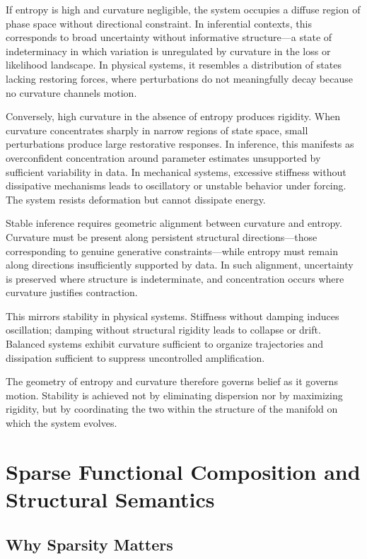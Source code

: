 \documentclass[12pt]{book}
\begin{document}
If entropy is high and curvature negligible, the system occupies a diffuse region of phase space without directional constraint. In inferential contexts, this corresponds to broad uncertainty without informative structure---a state of indeterminacy in which variation is unregulated by curvature in the loss or likelihood landscape. In physical systems, it resembles a distribution of states lacking restoring forces, where perturbations do not meaningfully decay because no curvature channels motion.

Conversely, high curvature in the absence of entropy produces rigidity. When curvature concentrates sharply in narrow regions of state space, small perturbations produce large restorative responses. In inference, this manifests as overconfident concentration around parameter estimates unsupported by sufficient variability in data. In mechanical systems, excessive stiffness without dissipative mechanisms leads to oscillatory or unstable behavior under forcing. The system resists deformation but cannot dissipate energy.

Stable inference requires geometric alignment between curvature and entropy. Curvature must be present along persistent structural directions---those corresponding to genuine generative constraints---while entropy must remain along directions insufficiently supported by data. In such alignment, uncertainty is preserved where structure is indeterminate, and concentration occurs where curvature justifies contraction.

This mirrors stability in physical systems. Stiffness without damping induces oscillation; damping without structural rigidity leads to collapse or drift. Balanced systems exhibit curvature sufficient to organize trajectories and dissipation sufficient to suppress uncontrolled amplification.

The geometry of entropy and curvature therefore governs belief as it governs motion. Stability is achieved not by eliminating dispersion nor by maximizing rigidity, but by coordinating the two within the structure of the manifold on which the system evolves.

\chapter{Sparse Functional Composition and Structural Semantics}

\section{Why Sparsity Matters}
\end{document}
